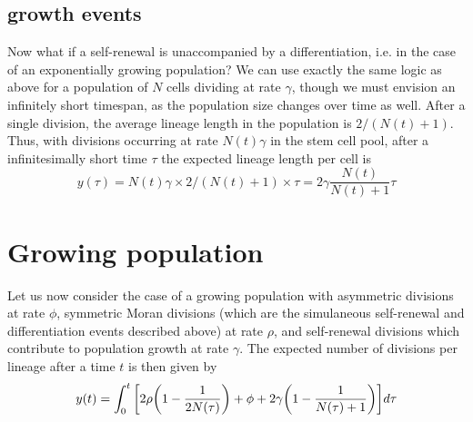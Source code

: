 \documentclass[pdftex,12pt,a4paper]{scrartcl}
\begin{document}
\subsection{growth events}
Now what if a self-renewal is unaccompanied by a differentiation, i.e. in the case of an exponentially growing population? We can use exactly the same logic as above for a population of $N$ cells dividing at rate $\gamma$, though we must envision an infinitely short timespan, as the population size changes over time as well. After a single division, the average lineage length in the population is $2/(N(t)+1)$. Thus, with divisions occurring at rate $N(t)\gamma$ in the stem cell pool, after a infinitesimally short time $\tau$ the expected lineage length per cell is
\begin{equation}
    y(\tau) = N(t)\gamma \times 2/(N(t)+1) \times \tau = 2\gamma \frac{N(t)}{N(t)+1}\tau
\end{equation}



\section{Growing population}
Let us now consider the case of a growing population with asymmetric divisions at rate $\phi$, symmetric Moran divisions (which are the simulaneous self-renewal and differentiation events described above) at rate $\rho$, and self-renewal divisions which contribute to population growth at rate $\gamma$. The expected number of divisions per lineage after a time $t$ is then given by
\begin{equation}
    y(t) = \int_0^t \qty[ 2\rho \qty(1 - \frac{1}{2N(\tau)} ) + \phi + 2\gamma \qty(1 - \frac{1}{N(\tau)+1}) ] d\tau
\end{equation} 
\end{document}
